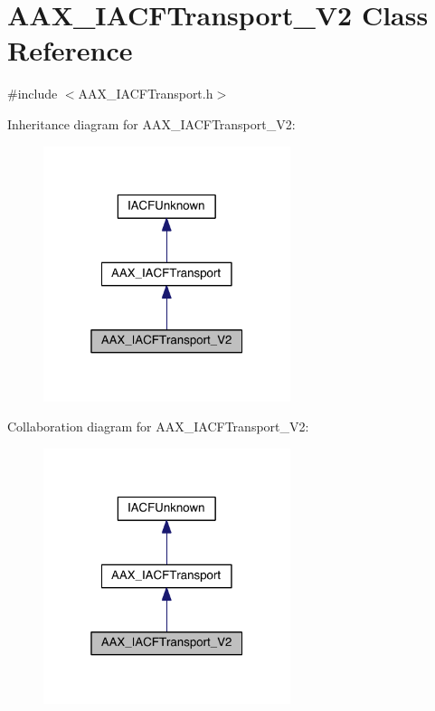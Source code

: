 \hypertarget{a00083}{}\section{A\+A\+X\+\_\+\+I\+A\+C\+F\+Transport\+\_\+\+V2 Class Reference}
\label{a00083}


{\ttfamily \#include $<$A\+A\+X\+\_\+\+I\+A\+C\+F\+Transport.\+h$>$}



Inheritance diagram for A\+A\+X\+\_\+\+I\+A\+C\+F\+Transport\+\_\+\+V2\+:
\nopagebreak
\begin{figure}[H]
\begin{center}
\leavevmode
\includegraphics[width=205pt]{a00592}
\end{center}
\end{figure}


Collaboration diagram for A\+A\+X\+\_\+\+I\+A\+C\+F\+Transport\+\_\+\+V2\+:
\nopagebreak
\begin{figure}[H]
\begin{center}
\leavevmode
\includegraphics[width=205pt]{a00593}
\end{center}
\end{figure}



